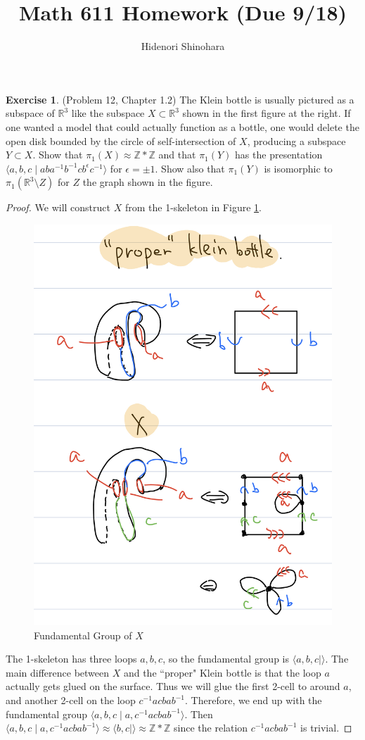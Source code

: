 \documentclass[12pt, psamsfonts]{amsart}
\theoremstyle{definition}
\newtheorem*{exer}{Exercise}
\theoremstyle{remark}
\numberwithin{equation}{section}
\begin{document}
\title{Math 611 Homework (Due 9/18)}
\author{Hidenori Shinohara}
\maketitle


\begin{exer}{(Problem 12, Chapter 1.2)}
  The Klein bottle is usually pictured as a subspace of $\mathbb{R}^3$ like the subspace $X \subset \mathbb{R}^3$ shown in the first figure at the right.
  If one wanted a model that could actually function as a bottle, one would delete the open disk bounded by the circle of self-intersection of $X$, producing a subspace $Y \subset X$.
  Show that $\pi_1(X) \approx \mathbb{Z} * \mathbb{Z}$ and that $\pi_1(Y)$ has the presentation $\langle a, b, c \mid aba^{-1}b^{-1}cb^{\epsilon}c^{-1} \rangle$ for $\epsilon = \pm 1$.
  Show also that $\pi_1(Y)$ is isomorphic to $\pi_1(\mathbb{R}^3 \setminus Z)$ for $Z$ the graph shown in the figure.
\end{exer}

\begin{proof}
  We will construct $X$ from the 1-skeleton in Figure \ref{fig:fund_x_klein}.
  \begin{figure}
    \includegraphics[width=.5\linewidth]{klein_solution_zz.jpeg}
      \caption{Fundamental Group of $X$}
    \label{fig:fund_x_klein}
  \end{figure}
  The 1-skeleton has three loops $a, b, c$, so the fundamental group is $\langle a, b, c \mid \rangle$.
  The main difference between $X$ and the ``proper" Klein bottle is that the loop $a$ actually gets glued on the surface.
  Thus we will glue the first 2-cell to around $a$, and another 2-cell on the loop $c^{-1}acbab^{-1}$.
  Therefore, we end up with the fundamental group $\langle a, b, c \mid a, c^{-1}acbab^{-1} \rangle$.
  Then $\langle a, b, c \mid a, c^{-1}acbab^{-1} \rangle \approx \langle b, c \mid \rangle \approx \mathbb{Z} * \mathbb{Z}$ since the relation $c^{-1}acbab^{-1}$ is trivial.

\end{proof}
\end{document}
